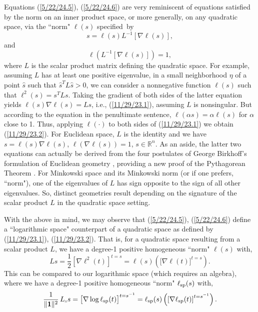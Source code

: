 \documentclass{amsart}
\numberwithin{equation}{section}
\theoremstyle{definition}
\numberwithin{theorem}{section}
\begin{document}
Equations (\ref{5/22/24.5}), (\ref{5/22/24.6}) are very reminiscent of equations satisfied by the norm on an inner product space, or more generally, on any quadratic space, via the ``norm" $\ell(s)$ \mbox{specified by} \begin{equation}\label{11/29/23.1} s = \ell(s)L^{-1}[\nabla\ell(s)],\end{equation} and \begin{equation}\label{11/29/23.2}\ell\left(L^{-1}[\nabla\ell(s)]\right) = 1,\end{equation} where $L$ is the scalar product matrix defining the quadratic space. For example, assuming $L$ has at least one positive eigenvalue, in a small neighborhood $\eta$ of a point $\hat{s}$ such that $\hat{s}^T L \hat{s} >0$, we can consider a nonnegative function $\ell(s)$ such that \mbox{$\ell^2(s)= s^TLs$}.  Taking the gradient of both sides of the latter equation yields $\ell(s) \nabla\ell(s)=Ls$, i.e., (\ref{11/29/23.1}), assuming $L$ is nonsingular.  But according to the equation in the penultimate sentence, $\ell(\alpha s) = \alpha\ell(s)$ for $\alpha$ close to 1.  Thus, applying $\ell(\cdot)$ to both sides of (\ref{11/29/23.1}) we obtain (\ref{11/29/23.2}).  
For Euclidean space, $L$ is the identity and we have $s=\ell(s)\nabla \ell(s)$, $\ell\left(\nabla \ell(s)\right) = 1$, $s\in \mathbb{R}^n$.  As an aside, the latter two equations can actually be derived from the four postulates of George Birkhoff's formulation of Euclidean geometry \cite{birkhoff:1932}, providing a new proof of the Pythagorean Theorem \cite{fgreensite:2022b}.  For Minkowski space and its Minkowski norm (or if one prefers, ``norm"), one of the eigenvalues of $L$ has sign opposite to the sign of all other eigenvalues.
So, distinct geometries result depending on the signature of the scalar product $L$ in the quadratic space setting.  

With the above in mind, we may observe that (\ref{5/22/24.5}), (\ref{5/22/24.6}) define a \mbox{``logarithmic} space" counterpart of a quadratic space as defined by (\ref{11/29/23.1}), (\ref{11/29/23.2}).  That is, for a quadratic space resulting from a scalar product $L$, we have a degree-1 positive homogeneous ``norm" $\ell(s)$ with, \begin{equation}\label{4/5/25.1} Ls = \frac{1}{2}\left[\nabla\ell^2(t)\right]^{t=s} = \ell(s)\left(\big[\nabla\ell(t)\big]^{t=s}\right).\end{equation}  This can be compared to our logarithmic space (which requires an algebra), where we have a degree-1 positive homogeneous ``norm" $\ell_{\rm sp}(s)$ with, \begin{equation}\label{4/5/25.2} \frac{1}{\|\mathbf{1}\|^2}\,L_{\shortparallel} s = \big[\nabla\log\ell_{\rm sp}(t)\big]^{t=s^{-1}} = \ell_{\rm sp}(s)\left(\left[\nabla\ell_{\rm sp}(t)\right]^{t=s^{-1}}\right).\end{equation}  
\end{document}
